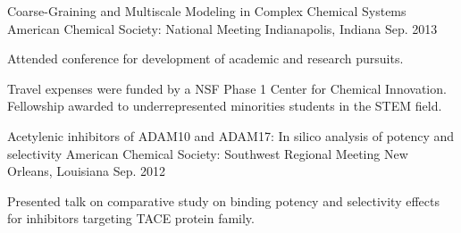 \begin{cventries}
  \cventry
    {Coarse-Graining and Multiscale Modeling in Complex Chemical Systems}
    {American Chemical Society: National Meeting}
    {Indianapolis, Indiana}
    {Sep. 2013}
    {
      \begin{cvitems}
        \item{Attended conference for development of academic and research pursuits.}
        \item{Travel expenses were funded by a NSF Phase 1 Center for Chemical Innovation. Fellowship awarded to underrepresented minorities students in the STEM field.}
      \end{cvitems}
    }

  \cventry
    {Acetylenic inhibitors of ADAM10 and ADAM17: In silico analysis of potency and selectivity} %
    {American Chemical Society: Southwest Regional Meeting} %
    {New Orleans, Louisiana} %
    {Sep. 2012} %
    {
      \begin{cvitems} %
        \item{Presented talk on comparative study on binding potency and selectivity effects for inhibitors targeting TACE protein family.}
      \end{cvitems}
    }
\end{cventries}
